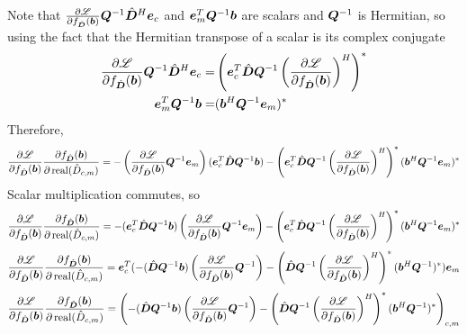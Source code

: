 \begin{appendices}
Note that $\frac{\partial \mathscr{L}}{\partial f_{\hat{\bm{D}}}(\bm{b})}\bm{Q}^{-1}\hat{\bm{D}}^H\bm{e}_c$ and $\bm{e}_m^T\bm{Q}^{-1}\bm{b}$ are scalars and $\bm{Q}^{-1}$ is Hermitian, so using the fact that the Hermitian transpose of a scalar is its complex conjugate
\begin{equation}
\begin{split}
\frac{\partial \mathscr{L}}{\partial f_{\hat{\bm{D}}}(\bm{b})}\bm{Q}^{-1}\hat{\bm{D}}^H\bm{e}_c = & \left(\bm{e}_c^T\hat{\bm{D}}\bm{Q}^{-1}\left(\frac{\partial \mathscr{L}}{\partial f_{\hat{\bm{D}}}(\bm{b})}\right)^H\right)^*
\\
\bm{e}_m^T\bm{Q}^{-1}\bm{b} = & (\bm{b}^H\bm{Q}^{-1}\bm{e}_m)^*
\end{split}
\end{equation}
Therefore,
\begin{equation}
\frac{\partial \mathscr{L}}{\partial f_{\hat{\bm{D}}}(\bm{b})}\frac{\partial f_{\hat{\bm{D}}}(\bm{b})}{\partial \operatorname{real}(\hat{D}_{c,m})} = -\left(\frac{\partial \mathscr{L}}{\partial f_{\hat{\bm{D}}}(\bm{b})}\bm{Q}^{-1}\bm{e}_m\right)(\bm{e}_c^T\hat{\bm{D}}\bm{Q}^{-1}\bm{b}) - \left(\bm{e}_c^T\hat{\bm{D}}\bm{Q}^{-1}\left(\frac{\partial \mathscr{L}}{\partial f_{\hat{\bm{D}}}(\bm{b})}\right)^H\right)^* (\bm{b}^H\bm{Q}^{-1}\bm{e}_m)^*
\end{equation}
Scalar multiplication commutes, so
\begin{equation}
\frac{\partial \mathscr{L}}{\partial f_{\hat{\bm{D}}}(\bm{b})}\frac{\partial f_{\hat{\bm{D}}}(\bm{b})}{\partial \operatorname{real}(\hat{D}_{c,m})} = -(\bm{e}_c^T\hat{\bm{D}}\bm{Q}^{-1}\bm{b})\left(\frac{\partial \mathscr{L}}{\partial f_{\hat{\bm{D}}}(\bm{b})}\bm{Q}^{-1}\bm{e}_m\right) - \left(\bm{e}_c^T\hat{\bm{D}}\bm{Q}^{-1}\left(\frac{\partial \mathscr{L}}{\partial f_{\hat{\bm{D}}}(\bm{b})}\right)^H\right)^* (\bm{b}^H\bm{Q}^{-1}\bm{e}_m)^*
\end{equation}
\begin{equation}
\frac{\partial \mathscr{L}}{\partial f_{\hat{\bm{D}}}(\bm{b})}\frac{\partial f_{\hat{\bm{D}}}(\bm{b})}{\partial \operatorname{real}(\hat{D}_{c,m})} = \bm{e}_c^T(-(\hat{\bm{D}}\bm{Q}^{-1}\bm{b})\left(\frac{\partial \mathscr{L}}{\partial f_{\hat{\bm{D}}}(\bm{b})}\bm{Q}^{-1}\right) - \left(\hat{\bm{D}}\bm{Q}^{-1}\left(\frac{\partial \mathscr{L}}{\partial f_{\hat{\bm{D}}}(\bm{b})}\right)^H\right)^* (\bm{b}^H\bm{Q}^{-1})^*)\bm{e}_m
\end{equation}
\begin{equation}
\frac{\partial \mathscr{L}}{\partial f_{\hat{\bm{D}}}(\bm{b})}\frac{\partial f_{\hat{\bm{D}}}(\bm{b})}{\partial \operatorname{real}(\hat{D}_{c,m})} = \left(-(\hat{\bm{D}}\bm{Q}^{-1}\bm{b})\left(\frac{\partial \mathscr{L}}{\partial f_{\hat{\bm{D}}}(\bm{b})}\bm{Q}^{-1}\right) - \left(\hat{\bm{D}}\bm{Q}^{-1}\left(\frac{\partial \mathscr{L}}{\partial f_{\hat{\bm{D}}}(\bm{b})}\right)^H\right)^* (\bm{b}^H\bm{Q}^{-1})^*\right)_{c,m}
\end{equation}


\end{appendices}

